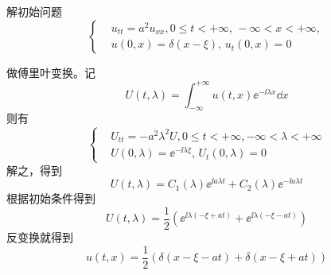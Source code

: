 \begin{problembox}
    \begin{example}\label{eg:3.3}
        解初始问题
        \begin{equation*}
            \left\{
                \begin{aligned}
                    &u_{tt} = a^2 u_{xx}, 0 \leq t < +\infty,\, -\infty < x < +\infty,\\
                    &u(0, x) = \delta(x - \xi),\, u_t(0, x) = 0
                \end{aligned}
            \right.
        \end{equation*}
    \end{example}
    \begin{solution}
        做傅里叶变换。记
        \[U(t, \lambda) = \int_{-\infty}^{+\infty} u(t, x) \ee^{-\ii \lambda x} \dd{x}\]
        则有
        \begin{equation*}
            \left\{
                \begin{aligned}
                    &U_{tt} = -a^2 \lambda^2 U, 0 \leq t < +\infty, -\infty < \lambda < +\infty\\
                    &U(0, \lambda) = \ee^{-\ii \lambda \xi},\, U_t(0, \lambda) = 0
                \end{aligned}
            \right.
        \end{equation*}
        解之，得到
        \[U(t, \lambda) = C_1(\lambda) \ee^{\ii a \lambda t} + C_2(\lambda) \ee^{-\ii a \lambda t}\]
        根据初始条件得到
        \[U(t, \lambda) = \frac{1}{2}\left(\ee^{\ii \lambda \left(-\xi + a t\right)} + \ee^{\ii \lambda \left(-\xi - a t\right)}\right)\]
        反变换就得到
        \[u(t, x) = \frac{1}{2}\left(\delta(x - \xi - a t) + \delta(x - \xi + a t)\right)\]
    \end{solution}
\end{problembox}


